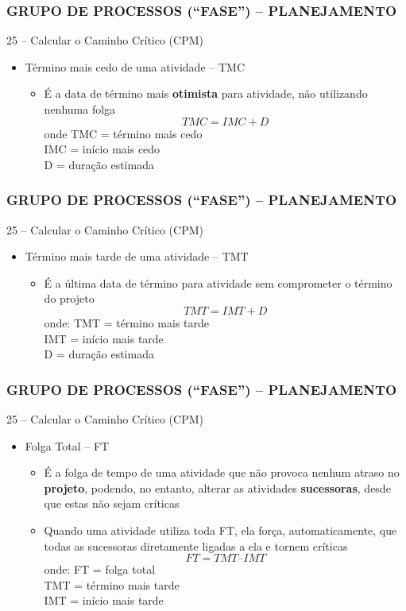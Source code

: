 \begin{frame}
 \frametitle{GRUPO DE PROCESSOS (“FASE”) – PLANEJAMENTO}
25 – Calcular o Caminho Crítico (CPM)
  \begin{itemize}
   \item Término mais cedo de uma atividade – TMC
   \begin{itemize}
    \item É a data de término mais \textbf{otimista} para atividade, não utilizando nenhuma folga
    \begin{equation}
     TMC = IMC + D
    \end{equation}
    onde TMC = término mais cedo \\
            IMC = início mais cedo  \\
            D = duração estimada
   \end{itemize}
  \end{itemize}
\end{frame}

\begin{frame}
 \frametitle{GRUPO DE PROCESSOS (“FASE”) – PLANEJAMENTO}
25 – Calcular o Caminho Crítico (CPM)
  \begin{itemize}
   \item Término mais tarde de uma atividade – TMT
   \begin{itemize}
    \item É a última data de término para atividade sem comprometer o término do projeto
    \begin{equation}
    TMT = IMT + D
    \end{equation}
    onde: TMT = término mais tarde \\
            IMT = início mais tarde\\
            D = duração estimada
   \end{itemize}
  \end{itemize}
\end{frame}

\begin{frame}
 \frametitle{GRUPO DE PROCESSOS (“FASE”) – PLANEJAMENTO}
25 – Calcular o Caminho Crítico (CPM)
  \begin{itemize}
   \item Folga Total – FT
   \begin{itemize}
    \item É a folga de tempo de uma atividade que não provoca nenhum atraso no \textbf{projeto}, podendo, no entanto, alterar as atividades \textbf{sucessoras}, desde que estas não sejam críticas
    \item Quando uma atividade utiliza toda FT, ela força, automaticamente, que todas as sucessoras diretamente ligadas a ela e tornem críticas
    \begin{equation}
   FT = TMT – IMT
    \end{equation}
    onde: FT = folga total \\
            TMT = término mais tarde \\
            IMT = início mais tarde
   \end{itemize}
  \end{itemize}
\end{frame}

